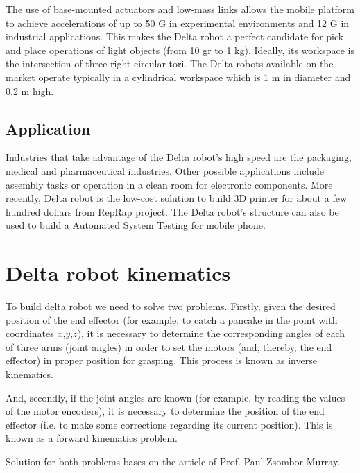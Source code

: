 The use of base-mounted actuators and low-mass links allows the mobile platform to achieve accelerations of up to 50 G in experimental environments and 12 G in industrial applications. This makes the Delta robot a perfect candidate for pick and place operations of light objects (from 10 gr to 1 kg). Ideally, its workspace is the intersection of three right circular tori. The Delta robots available on the market operate typically in a cylindrical workspace which is 1 m in diameter and 0.2 m high.

\subsection{Application}

Industries that take advantage of the Delta robot’s high speed are the packaging, medical and pharmaceutical industries. Other possible applications include assembly tasks or operation in a clean room for electronic components. More recently, Delta robot is the low-cost solution to build 3D printer for about a few hundred dollars from RepRap project\cite{reprap_thesis}. The Delta robot’s structure can also be used to build a Automated System Testing for mobile phone.

\section{Delta robot kinematics}

To build delta robot we need to solve two problems. Firstly, given the desired position of the end effector (for example, to catch a pancake in the point with coordinates $x$,$y$,$z$), it is necessary to determine the corresponding angles of each of three arms (joint angles) in order to set the motors (and, thereby, the end effector) in proper position for grasping. This process is known as inverse kinematics. 

And, secondly, if the joint angles are known (for example, by reading the values of the motor encoders), it is necessary to determine the position of the end effector (i.e. to make some corrections regarding its current position). This is known as a forward kinematics problem. 

Solution for both problems bases on the article of Prof. Paul Zsombor-Murray\cite{geometric_kinematic_analysis_thesis}. 

